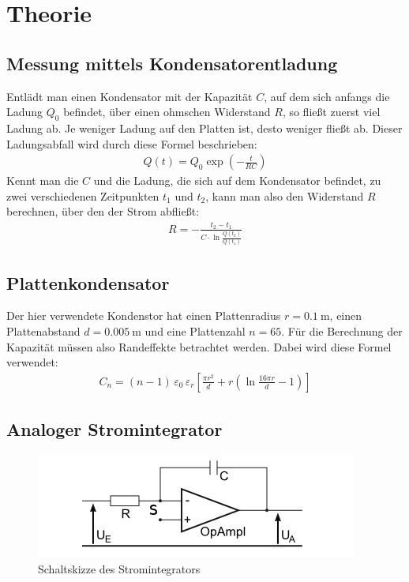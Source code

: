 \documentclass[12pt,a4paper,titlepage,headinclude,bibtotoc]{scrartcl}
\begin{document}
\section{Theorie}
\label{sec:theorie}
\subsection{Messung mittels Kondensatorentladung}
Entlädt man einen Kondensator mit der Kapazität $C$, auf dem sich anfangs die Ladung $Q_0$ befindet, über einen ohmschen Widerstand $R$, so fließt zuerst viel Ladung ab.
Je weniger Ladung auf den Platten ist, desto weniger fließt ab.
Dieser Ladungsabfall wird durch diese Formel beschrieben:
\begin{align}
	Q(t)=Q_0 \exp \left(-\frac{t}{RC}\right)
	\label{eq:Q(t)}
\end{align}
Kennt man die $C$ und die Ladung, die sich auf dem Kondensator befindet, zu zwei verschiedenen Zeitpunkten $t_1$ und $t_2$, kann man also den Widerstand $R$ berechnen, über den der Strom abfließt:
\begin{align*}
	R=-\frac{t_2-t_1}{C\cdot\ln\frac{Q(t_2)}{Q(t_1)}}
\end{align*}

\subsection{Plattenkondensator}
Der hier verwendete Kondenstor hat einen Plattenradius $r=0.1~\si{\meter}$, einen Plattenabstand $d=0.005~\si{\meter}$ und eine Plattenzahl $n=65$.
Für die Berechnung der Kapazität müssen also Randeffekte betrachtet werden.
Dabei wird diese Formel verwendet:
\begin{align}	
	C_n=(n-1)\,\varepsilon_0\,\varepsilon_r\left[\frac{\pi r^2}{d}+r\left(\ln\frac{16\pi r}{d}-1\right)\right]
	\label{eq:C_Pl}
\end{align}

\subsection{Analoger Stromintegrator}
\begin{figure}[!htb]
	\centering
	\includegraphics[scale=1.0]{Stromintegrator.png}
	\caption{Schaltskizze des Stromintegrators}
	\label{fig:Stromintegrator}
\end{figure}
\end{document}
